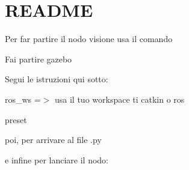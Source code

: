 \chapter{README}
\hypertarget{md_vision_2scripts_2README}{}\label{md_vision_2scripts_2README}
Per far partire il nodo visione usa il comando


\begin{DoxyEnumerate}
\item Fai partire gazebo
\item Segui le istruzioni qui sotto\+:
\end{DoxyEnumerate}

ros\+\_\+ws =\texorpdfstring{$>$}{>} usa il tuo workspace ti catkin o ros

preset 
\begin{DoxyCode}{0}

\end{DoxyCode}


poi, per arrivare al file .py 
\begin{DoxyCode}{0}

\end{DoxyCode}


e infine per lanciare il nodo\+: 
\begin{DoxyCode}{0}

\end{DoxyCode}
 